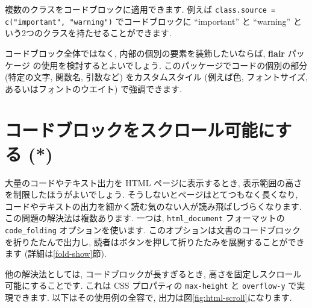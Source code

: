 \documentclass[
  11pt,
  lualatex,ja=standard,jafont=noto]{bxjsreport}
\begin{document}
複数のクラスをコードブロックに適用できます. 例えば \texttt{class.source = c("important", "warning")} でコードブロックに ``important'' と ``warning'' という2つのクラスを持たせることができます.

コードブロック全体ではなく, 内部の個別の要素を装飾したいならば, \textbf{flair} パッケージ \autocite{R-flair} の使用を検討するとよいでしょう. このパッケージでコードの個別の部分 (特定の文字, 関数名, 引数など) をカスタムスタイル (例えば色, フォントサイズ, あるいはフォントのウエイト) で強調できます.

\hypertarget{html-scroll}{%
\section{コードブロックをスクロール可能にする (*)}\label{html-scroll}}

大量のコードやテキスト出力を HTML ページに表示するとき, 表示範囲の高さを制限したほうがよいでしょう. そうしないとページはとてつもなく長くなり, コードやテキストの出力を細かく読む気のない人が読み飛ばしづらくなります. この問題の解決法は複数あります. 一つは, \texttt{html\_document} フォーマットの \texttt{code\_folding} オプションを使います. このオプションは文書のコードブロックを折りたたんで出力し, 読者はボタンを押して折りたたみを展開することができます (詳細は\ref{fold-show}節).

他の解決法としては, コードブロックが長すぎるとき, 高さを固定しスクロール可能にすることです. これは CSS プロパティの \texttt{max-height} と \texttt{overflow-y} で実現できます. 以下はその使用例の全容で, 出力は図\ref{fig:html-scroll}になります.
\end{document}
